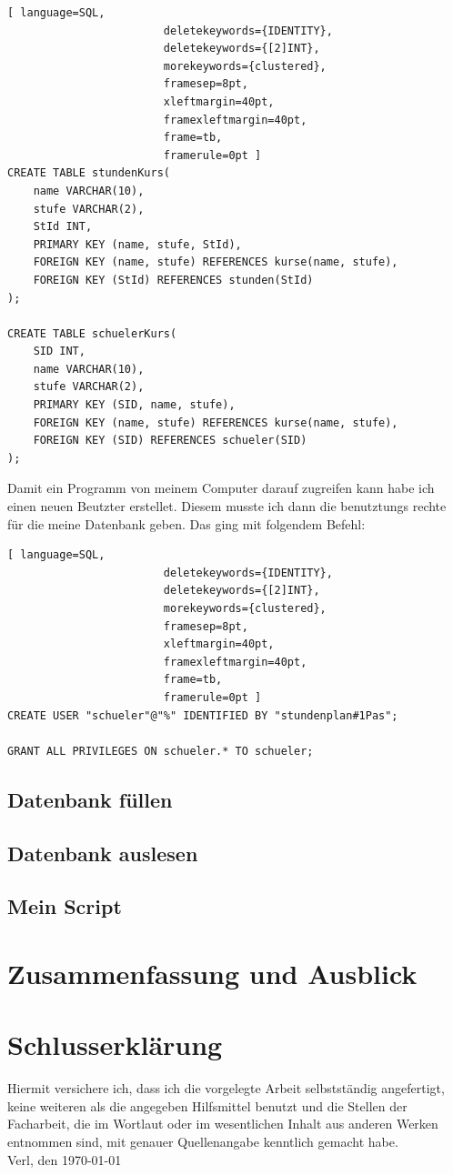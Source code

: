 \documentclass[a4paper, 12pt]{article}
\theoremstyle{plain}
\theoremstyle{definition}
\begin{document}
		\begin{lstlisting}[ language=SQL,
	                    deletekeywords={IDENTITY},
	                    deletekeywords={[2]INT},
	                    morekeywords={clustered},
	                    framesep=8pt,
	                    xleftmargin=40pt,
	                    framexleftmargin=40pt,
	                    frame=tb,
	                    framerule=0pt ]
CREATE TABLE stundenKurs(
	name VARCHAR(10), 
	stufe VARCHAR(2), 
	StId INT, 
	PRIMARY KEY (name, stufe, StId),
	FOREIGN KEY (name, stufe) REFERENCES kurse(name, stufe), 
	FOREIGN KEY (StId) REFERENCES stunden(StId)
);

CREATE TABLE schuelerKurs(
	SID INT, 
	name VARCHAR(10), 
	stufe VARCHAR(2),
	PRIMARY KEY (SID, name, stufe),
	FOREIGN KEY (name, stufe) REFERENCES kurse(name, stufe), 
	FOREIGN KEY (SID) REFERENCES schueler(SID)
);
	\end{lstlisting}
Damit ein Programm von meinem Computer darauf zugreifen kann habe ich einen neuen Beutzter erstellet. Diesem musste ich dann die benutztungs rechte für die meine Datenbank geben. Das ging mit folgendem Befehl:
	
	\begin{lstlisting}[ language=SQL,
	                    deletekeywords={IDENTITY},
	                    deletekeywords={[2]INT},
	                    morekeywords={clustered},
	                    framesep=8pt,
	                    xleftmargin=40pt,
	                    framexleftmargin=40pt,
	                    frame=tb,
	                    framerule=0pt ]	
CREATE USER "schueler"@"%" IDENTIFIED BY "stundenplan#1Pas";

GRANT ALL PRIVILEGES ON schueler.* TO schueler;
	\end{lstlisting}	
	\subsection{Datenbank füllen}
	\subsection{Datenbank auslesen}
	\subsection{Mein Script}
	\section{Zusammenfassung und Ausblick}
	\label{sec:end}
	\newpage
	\printbibliography	
	\appendix
	
	\newpage
	\section*{Schlusserklärung}
	Hiermit versichere ich, dass ich die vorgelegte Arbeit selbstständig angefertigt, keine weiteren als die angegeben	 Hilfsmittel benutzt und die Stellen der Facharbeit, die im Wortlaut oder im wesentlichen Inhalt aus anderen Werken entnommen sind, mit genauer Quellenangabe kenntlich gemacht habe.\\
	\vspace{4cm}
	Verl, den \today
\end{document}
